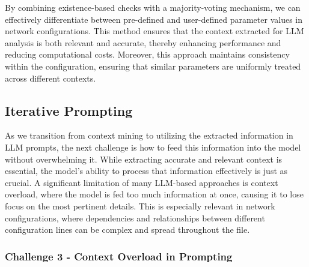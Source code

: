 By combining existence-based checks with a majority-voting mechanism, we can effectively differentiate between pre-defined and user-defined parameter values in network configurations. This method ensures that the context extracted for LLM analysis is both relevant and accurate, thereby enhancing performance and reducing computational costs. Moreover, this approach maintains consistency within the configuration, ensuring that similar parameters are uniformly treated across different contexts.


\subsection{Iterative Prompting}\label{prompting_method}
As we transition from context mining to utilizing the extracted information in LLM prompts, the next challenge is how to feed this information into the model without overwhelming it. While extracting accurate and relevant context is essential, the model's ability to process that information effectively is just as crucial. A significant limitation of many LLM-based approaches is context overload, where the model is fed too much information at once, causing it to lose focus on the most pertinent details. This is especially relevant in network configurations, where dependencies and relationships between different configuration lines can be complex and spread throughout the file.

\subsubsection{Challenge 3 - Context Overload in Prompting}
\label{challenge_3}

